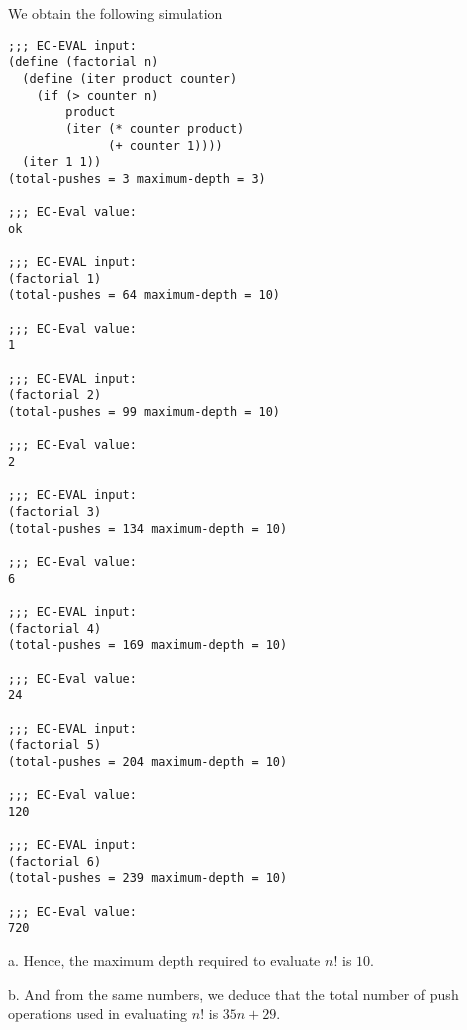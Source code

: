 \documentclass[a4paper,12pt]{article}
\newcommand{\subpar}[1]{\medskip \noindent #1.}
\begin{document}
We obtain the following simulation

\begin{lstlisting}
;;; EC-EVAL input:
(define (factorial n)
  (define (iter product counter)
    (if (> counter n)
        product
        (iter (* counter product)
              (+ counter 1))))
  (iter 1 1))
(total-pushes = 3 maximum-depth = 3)

;;; EC-Eval value:
ok

;;; EC-EVAL input:
(factorial 1)
(total-pushes = 64 maximum-depth = 10)

;;; EC-Eval value:
1

;;; EC-EVAL input:
(factorial 2)
(total-pushes = 99 maximum-depth = 10)

;;; EC-Eval value:
2

;;; EC-EVAL input:
(factorial 3)
(total-pushes = 134 maximum-depth = 10)

;;; EC-Eval value:
6

;;; EC-EVAL input:
(factorial 4)
(total-pushes = 169 maximum-depth = 10)

;;; EC-Eval value:
24

;;; EC-EVAL input:
(factorial 5)
(total-pushes = 204 maximum-depth = 10)

;;; EC-Eval value:
120

;;; EC-EVAL input:
(factorial 6)
(total-pushes = 239 maximum-depth = 10)

;;; EC-Eval value:
720
\end{lstlisting}

\subpar{a} Hence, the maximum depth required to evaluate $n!$ is $10$.

\subpar{b} And from the same numbers, we deduce that the total number
of push operations used in evaluating $n!$ is $35 n + 29$.
\end{document}
